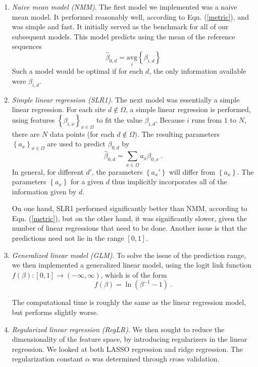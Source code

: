 \documentclass{article} %
\begin{document}
\begin{enumerate}
\item \emph{Naive mean model (NMM)}. The first model we implemented was a naive mean model. It performed reasonably well, according to Eqn. (\ref{metric}), and was simple and fast. It initially served as the benchmark for all of our subsequent models. This model predicts using the mean of the reference sequences
\[ \hat{\beta}_{0,d} = \underset{i}{\text{avg}} \left\{ \beta_{i,d}\right\}\]
Such a model would be optimal if for each $d$, the only information available were $\beta_{i,d}$.

\item \emph{Simple linear regression (SLR1)}. The next model was essentially a simple linear regression. For each site $d \notin \Omega$, a simple linear regression is performed, using features $\left\{ \beta_{i,x} \right\}_{x \in \Omega}$ to fit the value $\beta_{i,d}$. Because $i$ runs from $1$ to $N$, there are $N$ data points (for each $d \notin \Omega)$. The resulting parameters $\left\{ a_x\right\}_{x \in \Omega}$ are used to predict $\beta_{0,d}$ by
\begin{equation} \label{beta.sites}\hat{\beta}_{0,d} = \sum_{x \in \Omega} a_x \beta_{0,x} \ .\end{equation}
In general, for different $d'$, the parameters $\left\{a_x'\right\}$ will differ from $\left\{a_x\right\}$. The parameters $\left\{a_x\right\}$ for a given $d$ thus implicitly incorporates all of the information given by $d$.

On one hand, SLR1 performed significantly better than NMM, according to Eqn. (\ref{metric}), but on the other hand, it was significantly slower, given the number of linear regressions that need to be done. Another issue is that the predictions need not lie in the range $[0,1]$.

\item \emph{Generalized linear model (GLM)}. To solve the issue of the prediction range, we then implemented a generalized linear model, using the logit link function $f(\beta): [0,1] \to (-\infty,\infty)$, which is of the form
\[ f(\beta) = \ln(\beta^{-1} - 1) \ .\]

The computational time is roughly the same as the linear regression model, but performs slightly worse.

\item \emph{Regularized linear regression (RegLR)}. We then sought to reduce the dimensionality of the feature space, by introducing regularizers in the linear regression. We looked at both LASSO regression and ridge regression. The regularization constant $\alpha$ was determined through cross validation.


\end{enumerate}
\end{document}
